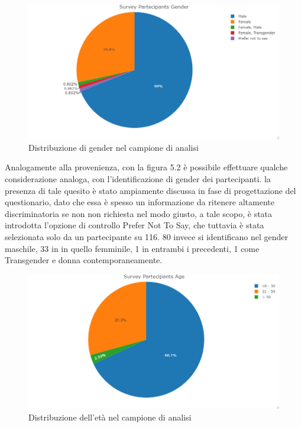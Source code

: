     \begin{figure}[h]
        \centering
        \includegraphics[width=1\textwidth]{figure/Analisi/Background/Survey_Partecipants_Gender.png}
        \caption{Distribuzione di gender nel campione di analisi}
    \end{figure}
    
    Analogamente alla provenienza, con la figura 5.2 è possibile effettuare qualche considerazione analoga, con l'identificazione di gender dei partecipanti. la presenza di tale quesito è stato ampiamente discussa in fase di progettazione del questionario, dato che essa è spesso un informazione da ritenere altamente discriminatoria se non non richiesta nel modo giusto, a tale scopo, è stata introdotta l'opzione di controllo Prefer Not To Say, che tuttavia è stata selezionata solo da un partecipante su 116. 80 invece si identificano nel gender maschile, 33 in in quello femminile, 1 in entrambi i precedenti, 1 come Transgender e donna contemporaneamente.\\
    
    \begin{figure}[h!]
        \centering
        \includegraphics[width=1\textwidth]{figure/Analisi/Background/Survey_Partecipants_Age.png}
        \caption{Distribuzione dell'età nel campione di analisi}
    \end{figure}
    
